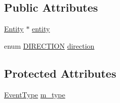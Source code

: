 \subsection*{Public Attributes}
\begin{DoxyCompactItemize}
\item 
\hyperlink{classEntity}{Entity} $\ast$ \hyperlink{classMoveEntityEvent_aab414806813e40d92ac4c93fbf981a2b}{entity}
\item 
enum \hyperlink{classMoveEntityEvent_a7058a943643bee9164a21e62e3392807}{D\-I\-R\-E\-C\-T\-I\-O\-N} \hyperlink{classMoveEntityEvent_ac55de930d27e83d1eb92968e9c3f41eb}{direction}
\end{DoxyCompactItemize}
\subsection*{Protected Attributes}
\begin{DoxyCompactItemize}
\item 
\hyperlink{event_8h_a2628ea8d12e8b2563c32f05dc7fff6fa}{Event\-Type} \hyperlink{classEvent_a38264e3fb229dc64123dff1d5a7dcf9e}{m\-\_\-type}
\end{DoxyCompactItemize}


